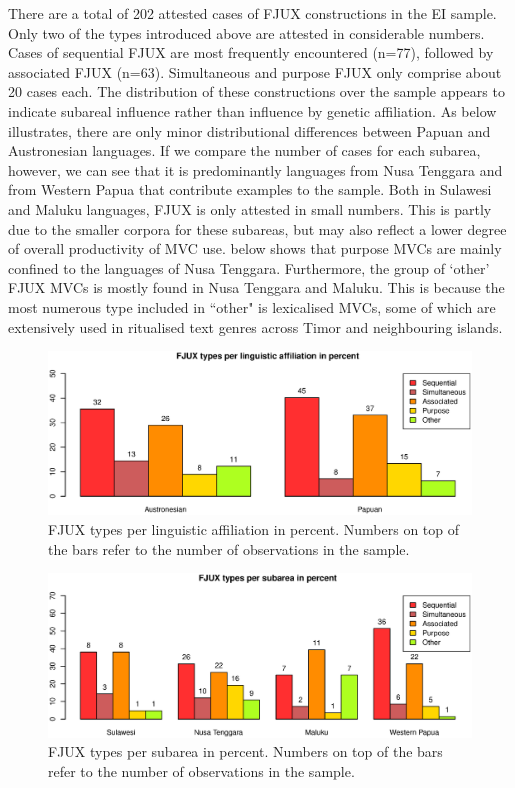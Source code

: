 There are a total of 202 attested cases of FJUX constructions in the EI sample. Only two of the types introduced above are attested in considerable numbers. Cases of sequential FJUX are most frequently encountered (n=77), followed by associated FJUX (n=63). Simultaneous and purpose FJUX only comprise about 20 cases each. The distribution of these constructions over the sample appears to indicate subareal influence rather than influence by genetic affiliation. As  below illustrates, there are only minor distributional differences between Papuan and Austronesian languages. If we compare the number of cases for each subarea, however, we can see that it is predominantly languages from Nusa Tenggara and from Western Papua that contribute examples to the sample. Both in Sulawesi and Maluku languages, FJUX is only attested in small numbers. This is partly due to the smaller corpora for these subareas, but may also reflect a lower degree of overall productivity of MVC use.  below shows that purpose MVCs are mainly confined to the languages of Nusa Tenggara. Furthermore, the group of `other' FJUX MVCs is mostly found in Nusa Tenggara and Maluku. This is because the most numerous type included in ``other" is lexicalised MVCs, some of which are extensively used in ritualised text genres across Timor and neighbouring islands.

\begin{figure}[b]
\includegraphics[width=\columnwidth]{figures/FJUX_family.eps}
\caption[FJUX types per linguistic affiliation in percent]{FJUX types per linguistic affiliation in percent. Numbers on top of the bars refer to the number of observations in the sample.}\label{fig:fjux-family}
\end{figure}
\begin{figure}[b]
\includegraphics[width=\columnwidth]{figures/FJUX_group.eps}
\caption[FJUX types per subarea in percent]{FJUX types per subarea in percent. Numbers on top of the bars refer to the number of observations in the sample.}\label{fig:fjux-group}
\end{figure}

